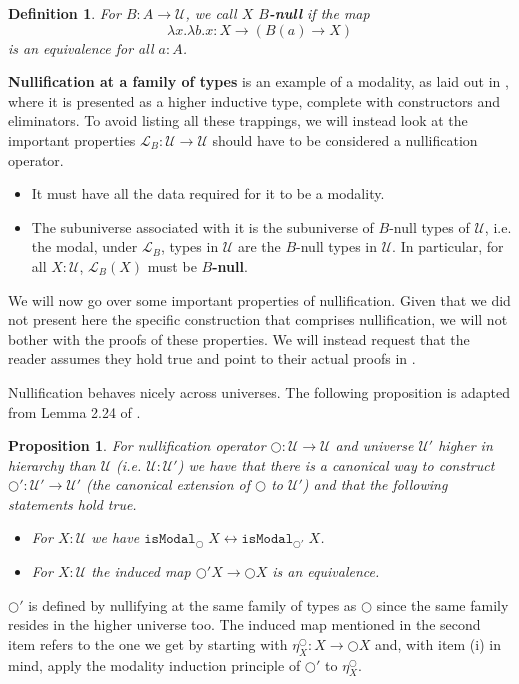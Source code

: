 \documentclass[12pt]{report}
\newtheorem{prop}[thm]{Proposition}
\newtheorem{defn}[thm]{Definition}
\theoremstyle{definition}
\begin{document}
\begin{defn}\label{Bnull}
For $B : A \rightarrow \mathcal{U}$, we call $X$ $B$\textbf{-null} if the map 
$$\lambda x. \lambda b.x : X \rightarrow (B(a) \rightarrow X)$$
is an equivalence for all $a : A$.

\end{defn}

\textbf{Nullification at a family of types} is an example of a modality, as laid out in \cite{1706.07526}, where it is presented as a higher inductive type, complete with constructors and eliminators. 
To avoid listing all these trappings, we will instead look at the important properties $\mathcal{L}_B : \mathcal{U} \rightarrow \mathcal{U}$ should have to be considered a nullification operator. 
\begin{itemize}
\item It must have all the data required for it to be a modality. 
\item The subuniverse associated with it is the subuniverse of $B$-null types of $\mathcal{U}$, i.e. the modal, under $\mathcal{L}_B$, types in $\mathcal{U}$ are the $B$-null types in $\mathcal{U}$. 
In particular, for all $X : \mathcal{U}$, $\mathcal{L}_B(X)$ must be $B$\textbf{-null}.
\end{itemize}
We will now go over some important properties of nullification. 
Given that we did not present here the specific construction that comprises nullification, we will not bother with the proofs of these properties. 
We will instead request that the reader assumes they hold true and point to their actual proofs in \cite{1706.07526}. 

Nullification behaves nicely across universes. 
The following proposition is adapted from Lemma 2.24 of \cite{1706.07526}. 
\begin{prop}
For nullification operator $\bigcirc : \mathcal{U} \rightarrow \mathcal{U}$ and universe $\mathcal{U}'$ higher in hierarchy than $\mathcal{U}$ (i.e. $\mathcal{U} : \mathcal{U}'$) we have that there is a canonical way to construct $\bigcirc' : \mathcal{U}' \rightarrow \mathcal{U}'$ (the canonical extension of $\bigcirc$ to $\mathcal{U}'$) and that the following statements hold true. 
\begin{itemize}
\item For $X : \mathcal{U}$ we have $\mathtt{isModal}_\bigcirc\; X \leftrightarrow \mathtt{isModal}_{\bigcirc'}\; X$.
\item For $X : \mathcal{U}$ the induced map $\bigcirc' X \rightarrow \bigcirc X$ is an equivalence. 
\end{itemize}
\end{prop}
$\bigcirc'$ is defined by nullifying at the same family of types as $\bigcirc$ since the same family resides in the higher universe too. 
The induced map mentioned in the second item refers to the one we get by starting with $\eta_X^{\bigcirc} : X \rightarrow \bigcirc X$ and, with item (i) in mind, apply the modality induction principle of $\bigcirc'$ to $\eta_X^{\bigcirc}$. 
\end{document}
